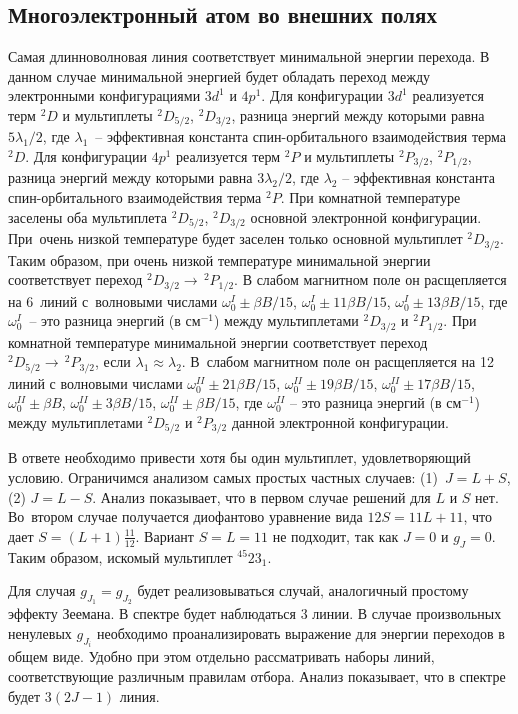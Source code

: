 \subsection{Многоэлектронный атом во внешних полях}
 Самая длинноволновая линия соответствует минимальной энергии перехода. В данном случае минимальной энергией будет обладать переход между электронными конфигурациями $3d^1$ и $4p^1$. Для конфигурации $3d^1$ реализуется терм $^2D$ и мультиплеты $^2D_{5/2}$, $^2D_{3/2}$, разница энергий между которыми равна $5\lambda_1/2$, где $\lambda_1$~– эффективная константа спин-орбитального взаимодействия терма $^2D$. Для конфигурации $4p^1$ реализуется терм $^2P$ и мультиплеты $^2P_{3/2}$, $^2P_{1/2}$, разница энергий между которыми равна $3\lambda_2/2$, где $\lambda_2$ – эффективная константа спин-орбитального взаимодействия терма $^2P$. При комнатной температуре заселены оба мультиплета $^2D_{5/2}$, $^2D_{3/2}$ основной электронной конфигурации. При~очень низкой температуре будет заселен только основной мультиплет $^2D_{3/2}$. Таким образом, при очень низкой температуре минимальной энергии соответствует переход $^2D_{3/2} \rightarrow\, ^2P_{1/2}$. В слабом магнитном поле он расщепляется на 6~линий с~волновыми числами $\omega_{0}^I \pm \beta B/15$, $\omega_{0}^I \pm 11\beta B/15$, $\omega_{0}^I \pm 13\beta B/15$, где $\omega_{0}^I$~– это разница энергий (в см$^{-1}$) между мультиплетами $^2D_{3/2}$ и $^2P_{1/2}$. При комнатной температуре минимальной энергии соответствует переход $^2D_{5/2} \rightarrow\, ^2P_{3/2}$, если $\lambda_1 \approx \lambda_2$. В~слабом магнитном поле он расщепляется на 12 линий с волновыми числами $\omega_{0}^{II} \pm 21\beta B/15$, $\omega_{0}^{II} \pm 19\beta B/15$, $\omega_{0}^{II} \pm 17\beta B/15$, $\omega_{0}^{II} \pm \beta B$, $\omega_{0}^{II} \pm 3\beta B/15$, $\omega_{0}^{II} \pm \beta B/15$, где $\omega_{0}^{II}$ – это разница энергий (в см$^{-1}$) между мультиплетами $^2D_{5/2}$ и $^2P_{3/2}$ данной электронной конфигурации.
\par
{} В ответе необходимо привести хотя бы один мультиплет, удовлетворяющий условию. Ограничимся анализом самых простых частных случаев: (1)~$J=L+S$, (2) $J=L-S$. Анализ показывает, что в первом случае решений для $L$ и $S$ нет. Во~втором случае получается диофантово уравнение вида $12S=11L+11$, что дает $S=(L+1)\frac{11}{12}$. Вариант $S=L=11$ не подходит, так как $J=0$ и $g_J=0$. Таким образом, искомый мультиплет $^{45}23_{1}$.
\par
{} Для случая $g_{J_1} = g_{J_2}$ будет реализовываться случай, аналогичный простому эффекту Зеемана. В спектре будет наблюдаться 3 линии. В случае произвольных ненулевых $g_{J_i}$ необходимо проанализировать выражение для энергии переходов в общем виде. Удобно при этом отдельно рассматривать наборы линий, соответствующие различным правилам отбора. Анализ показывает, что в спектре будет $3(2J-1)$ линия.\par
